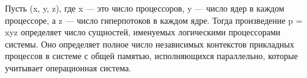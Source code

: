 Пусть (x, y, z), где x — это число процессоров, y — число ядер в каждом процессоре, а z — число гиперпотоков в каждом ядре. Тогда произведение p = xyz определяет число сущностей, именуемых логическими процессорами системы. Оно определяет полное число независимых контекстов прикладных процессов в системе с общей памятью, исполняющихся параллельно, которые учитывает операционная система.

